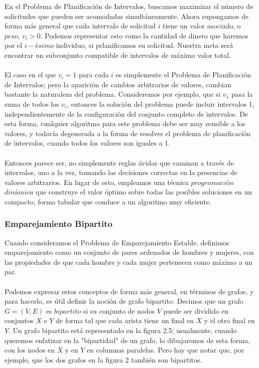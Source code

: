 \documentclass[a4paper]{article}
\begin{document}
En el Problema de Planificación de Intervalos, buscamos maximizar el número de solicitudes que pueden ser acomodadas simultáneamente. Ahora supongamos de forma más general que cada intervalo de solicitud $i$ tiene un valor asociado, o $peso$, $v_i > 0$. Podemos representar esto como la cantidad de dinero que haremos por el $i-ésimo$ individuo, si prlanificamos su solicitud. Nuestra meta será encontrar un subconjunto compatible de intervalos de máximo valor total.
\\\\
El caso en el que $v_i = 1$ para cada $i$ es simplemente el Problema de Planificación de Intervalos; pero la aparición de cambios arbitrarios de valores, cambian bastante la naturaleza del problema. Consideremos por ejemplo, que si $v_1$ pasa la suma de todos los $v_i$, entonces la solución del problema puede incluir intervalos 1, independientemente de la configuración del conjunto completo de intervalos. De esta forma, cualquier algoritmo para este problema debe ser muy sensible a los valores, y todavía degenerada a la forma de resolver el problema de planificación de intervalos, cuando todos los valores son iguales a 1.
\\\\
Entonces parece ser, no simplemente reglas ávidas que caminan a través de intervalos, uno a la vez, tomando las decisiones correctas en la presencias de valores arbitrarios. En lugar de esto, empleamos una técnica $programación$ $dinámica$ que construye el valor óptimo sobre todas las posibles soluciones en un compacto, forma tabular que conduce a un algoritmo muy eficiente.\\

\subsubsection*{Emparejamiento Bipartito}

Cuando consideramos el Problema de Emparejamiento Estable, definimos emparejamiento como un conjunto de pares ordenados de hombres y mujeres, con las propiedades de que cada hombre y cada mujer pertenecen como máximo a un par.\\\\
Podemos expresar estos conceptos de forma más general, en términos de grafos, y para hacerlo, es útil definir la noción de grafo bipartito. Decimos que un grafo $G = (V,E)$ es $bipartito$ si su conjunto de nodos $V$ puede ser dividido en conjuntos $X$ e $Y$ de forma tal que cada arista tiene un final en $X$ y el otro final en $Y$. Un grafo bipartito está representado en la figura 2.5; usualmente, cuando queremos enfatizar en la "bipartidad" de un grafo, lo dibujaremos de esta forma, con los nodos en $X$ y en $Y$ en columnas paralelas. Pero hay que notar que, por ejemplo, que los dos grafos en la figura 2 también son bipartitos.\\\\
\end{document}
